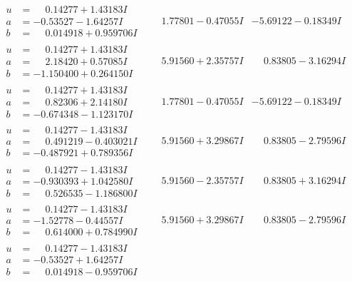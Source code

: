 \documentclass[1p]{elsarticle_modified}
\theoremstyle{definition}
\begin{document}
$$\begin{array}{c|c|c}
\begin{aligned}
u &= \phantom{-}0.14277 + 1.43183 I \\
a &= -0.53527 - 1.64257 I \\
b &= \phantom{-}0.014918 + 0.959706 I\end{aligned}
 & \phantom{-}1.77801 - 0.47055 I & -5.69122 - 0.18349 I \\ \hline\begin{aligned}
u &= \phantom{-}0.14277 + 1.43183 I \\
a &= \phantom{-}2.18420 + 0.57085 I \\
b &= -1.150400 + 0.264150 I\end{aligned}
 & \phantom{-}5.91560 + 2.35757 I & \phantom{-}0.83805 - 3.16294 I \\ \hline\begin{aligned}
u &= \phantom{-}0.14277 + 1.43183 I \\
a &= \phantom{-}0.82306 + 2.14180 I \\
b &= -0.674348 - 1.123170 I\end{aligned}
 & \phantom{-}1.77801 - 0.47055 I & -5.69122 - 0.18349 I \\ \hline\begin{aligned}
u &= \phantom{-}0.14277 - 1.43183 I \\
a &= \phantom{-}0.491219 - 0.403021 I \\
b &= -0.487921 + 0.789356 I\end{aligned}
 & \phantom{-}5.91560 + 3.29867 I & \phantom{-}0.83805 - 2.79596 I \\ \hline\begin{aligned}
u &= \phantom{-}0.14277 - 1.43183 I \\
a &= -0.930393 + 1.042580 I \\
b &= \phantom{-}0.526535 - 1.186800 I\end{aligned}
 & \phantom{-}5.91560 - 2.35757 I & \phantom{-}0.83805 + 3.16294 I \\ \hline\begin{aligned}
u &= \phantom{-}0.14277 - 1.43183 I \\
a &= -1.52778 - 0.44557 I \\
b &= \phantom{-}0.614000 + 0.784990 I\end{aligned}
 & \phantom{-}5.91560 + 3.29867 I & \phantom{-}0.83805 - 2.79596 I \\ \hline\begin{aligned}
u &= \phantom{-}0.14277 - 1.43183 I \\
a &= -0.53527 + 1.64257 I \\
b &= \phantom{-}0.014918 - 0.959706 I\end{aligned}

\end{array}$$
\end{document}

